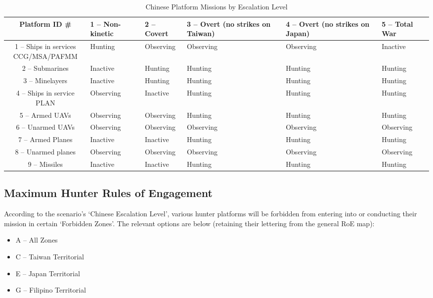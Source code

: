 \documentclass{article}
\begin{document}
\begin{table}[H]
\centering
\begin{tabularx}{\textwidth}{|c|X|X|X|X|X|}
\hline
\textbf{Platform ID \#} & \textbf{1 -- Non-kinetic} & \textbf{2 -- Covert} & \textbf{3 -- Overt (no strikes on Taiwan)} & \textbf{4 -- Overt (no strikes on Japan)} & \textbf{5 -- Total War} \\ 
\hline
1 -- \makecell{Ships in services \\ CCG/MSA/PAFMM} & Hunting & Observing & Observing & Observing & Inactive \\ 
\hline
2 -- Submarines & Inactive & Hunting & Hunting & Hunting & Hunting \\ 
\hline
3 -- Minelayers & Inactive & Hunting & Hunting & Hunting & Hunting \\ 
\hline
4 -- Ships in service PLAN & Observing & Inactive & Hunting & Hunting & Hunting \\ 
\hline
5 -- Armed UAVs & Observing & Observing & Hunting & Hunting & Hunting \\ 
\hline
6 -- Unarmed UAVs & Observing & Observing & Observing & Observing & Observing \\ 
\hline
7 -- Armed Planes & Inactive & Inactive & Hunting & Hunting & Hunting \\ 
\hline
8 -- Unarmed planes & Observing & Observing & Observing & Observing & Observing \\ 
\hline
9 -- Missiles & Inactive & Inactive & Hunting & Hunting & Hunting \\ 
\hline
\end{tabularx}
\caption{Chinese Platform Missions by Escalation Level}
\end{table}




\subsection*{Maximum Hunter Rules of Engagement}

According to the scenario’s ‘Chinese Escalation Level’, various hunter platforms will be forbidden from entering into or conducting their mission in certain ‘Forbidden Zones’. The relevant options are below (retaining their lettering from the general RoE map):
\begin{itemize}
    \item A -- All Zones
    \item C -- Taiwan Territorial
    \item E -- Japan Territorial
    \item G -- Filipino Territorial
\end{itemize}
\end{document}
